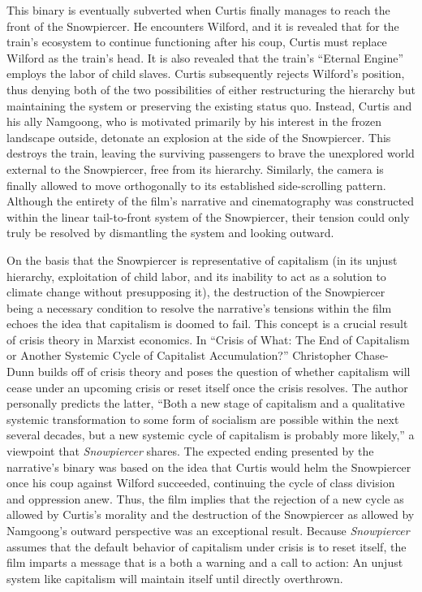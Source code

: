 \documentclass[12pt, letterpaper]{article}
\begin{document}
\begin{mla}
This binary is eventually subverted when Curtis finally manages to reach the
front of the Snowpiercer. He encounters Wilford, and it is revealed that for
the train's ecosystem to continue functioning after his coup, Curtis must
replace Wilford as the train's head. It is also revealed that the train's
``Eternal Engine'' employs the labor of child slaves. Curtis subsequently
rejects Wilford's position, thus denying both of the two possibilities of
either restructuring the hierarchy but maintaining the system or preserving
the existing status quo. Instead, Curtis and his ally Namgoong, who is
motivated primarily by his interest in the frozen landscape outside, detonate
an explosion at the side of the Snowpiercer. This destroys the train, leaving
the surviving passengers to brave the unexplored world external to the
Snowpiercer, free from its hierarchy. Similarly, the camera is finally allowed
to move orthogonally to its established side-scrolling pattern. Although the
entirety of the film's narrative and cinematography was constructed within the
linear tail-to-front system of the Snowpiercer, their tension could only truly
be resolved by dismantling the system and looking outward.

On the basis that the Snowpiercer is representative of capitalism (in its
unjust hierarchy, exploitation of child labor, and its inability to act as a
solution to climate change without presupposing it), the destruction of the
Snowpiercer being a necessary condition to resolve the narrative's tensions
within the film echoes the idea that capitalism is doomed to fail. This
concept is a crucial result of crisis theory in Marxist economics. In ``Crisis
of What: The End of Capitalism or Another Systemic Cycle of Capitalist
Accumulation?'' Christopher Chase-Dunn builds off of crisis theory and poses
the question of whether capitalism will cease under an upcoming crisis or
reset itself once the crisis resolves. The author personally predicts the
latter, ``Both a new stage of capitalism and a qualitative systemic
transformation to some form of socialism are possible within the next several
decades, but a new systemic cycle of capitalism is probably more likely,'' a
viewpoint that \textit{Snowpiercer} shares. The expected ending presented by
the narrative's binary was based on the idea that Curtis would helm the
Snowpiercer once his coup against Wilford succeeded, continuing the cycle of
class division and oppression anew. Thus, the film implies that the rejection
of a new cycle as allowed by Curtis's morality and the destruction of the
Snowpiercer as allowed by Namgoong's outward perspective was an exceptional
result. Because \textit{Snowpiercer} assumes that the default behavior of
capitalism under crisis is to reset itself, the film imparts a message that
is a both a warning and a call to action: An unjust system like capitalism
will maintain itself until directly overthrown.


\end{mla}
\end{document}
